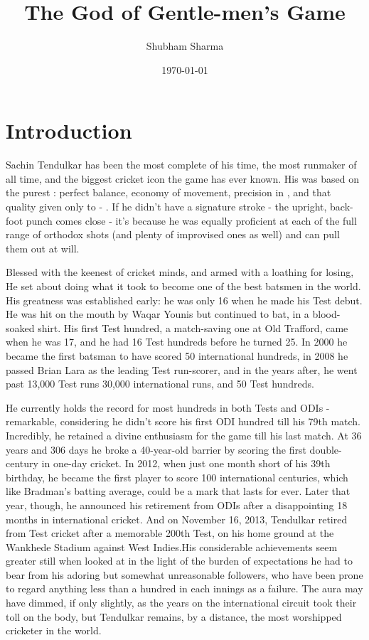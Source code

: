 \documentclass[12pt,twocolumn ]{article}
\title{The God of Gentle-men's Game}
\author{Shubham Sharma}
\date{\today}
\begin{document}
\onecolumn
\maketitle
\tableofcontents
\listoffigures
\listoftables
\newpage
\twocolumn
\section{Introduction}
\par Sachin Tendulkar has been the most complete  of his time, the most  runmaker of all time, and  the biggest cricket icon the game has ever known. His  was based on the purest : perfect balance, economy of movement, precision in , and that  quality given only to  - . If he didn't have a signature stroke - the upright, back-foot punch comes close - it's because he was equally proficient at each of the full range of orthodox shots (and plenty of improvised ones as well) and can pull them out at will.\par Blessed with the keenest of cricket minds, and armed with a loathing for losing, He set about doing what it took to become one of the best batsmen in the world. His greatness was established early: he was only 16 when he made his Test debut. He was hit on the mouth by Waqar Younis but continued to bat, in a blood-soaked shirt. His first Test hundred, a match-saving one at Old Trafford, came when he was 17, and he had 16 Test hundreds before he turned 25. In 2000 he became the first batsman to have scored 50 international hundreds, in 2008 he passed Brian Lara as the leading Test run-scorer, and in the years after, he went past 13,000 Test runs 30,000 international runs, and 50 Test hundreds.\par He currently holds the record for most hundreds in both Tests and ODIs - remarkable, considering he didn't score his first ODI hundred till his 79th match. Incredibly, he retained a divine enthusiasm for the game till his last match. At 36 years and 306 days he broke a 40-year-old barrier by scoring the first double-century in one-day cricket. In 2012, when just one month short of his 39th birthday, he became the first player to score 100 international centuries, which like Bradman's batting average, could be a mark that lasts for ever. Later that year, though, he announced his retirement from ODIs after a disappointing 18 months in international cricket. And on November 16, 2013, Tendulkar retired from Test cricket after a memorable 200th Test, on his home ground at the Wankhede Stadium against West Indies.His considerable achievements seem greater still when looked at in the light of the burden of expectations he had to bear from his adoring but somewhat unreasonable followers, who have been prone to regard anything less than a hundred in each innings as a failure. The aura may have dimmed, if only slightly, as the years on the international circuit took their toll on the body, but Tendulkar remains, by a distance, the most worshipped cricketer in the world\cite{sambit}.
\end{document}
